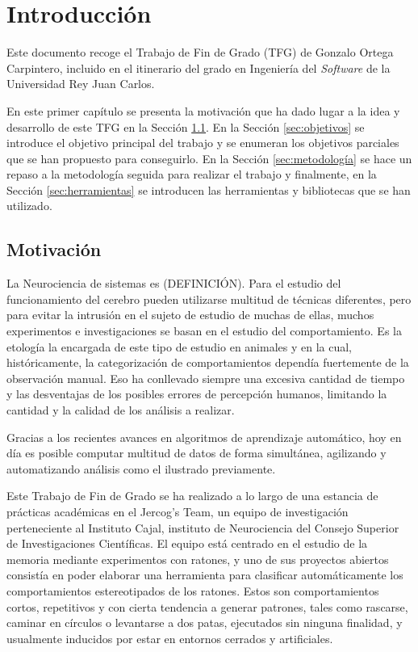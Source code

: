 \chapter{Introducción}
Este documento recoge el Trabajo de Fin de Grado (TFG) de Gonzalo Ortega Carpintero, incluido en el itinerario del grado en Ingeniería del \textit{Software} de la Universidad Rey Juan Carlos.

En este primer capítulo se presenta la motivación que ha dado lugar a la idea y desarrollo de este TFG en la Sección \ref{sec:motivacion}. En la Sección \ref{sec:objetivos} se introduce el objetivo principal del trabajo y se enumeran los objetivos parciales que se han propuesto para conseguirlo. En la Sección \ref{sec:metodología} se hace un repaso a la metodología seguida para realizar el trabajo y finalmente, en la Sección \ref{sec:herramientas} se introducen las herramientas y bibliotecas que se han utilizado.

\section{Motivación} \label{sec:motivacion}

La Neurociencia de sistemas es (DEFINICIÓN). Para el estudio del funcionamiento del cerebro pueden utilizarse multitud de técnicas diferentes, pero para evitar la intrusión en el sujeto de estudio de muchas de ellas, muchos experimentos e investigaciones se basan en el estudio del comportamiento. Es la etología la encargada de este tipo de estudio en animales y en la cual, históricamente, la categorización de comportamientos dependía fuertemente de la observación manual. Eso ha conllevado siempre una excesiva cantidad de tiempo y las desventajas de los posibles errores de percepción humanos, limitando la cantidad y la calidad de los análisis a realizar.

Gracias a los recientes avances en algoritmos de aprendizaje automático, hoy en día es posible computar multitud de datos de forma simultánea, agilizando y automatizando análisis como el ilustrado previamente.

Este Trabajo de Fin de Grado se ha realizado a lo largo de una estancia de prácticas académicas en el Jercog's Team, un equipo de investigación perteneciente al Instituto Cajal, instituto de Neurociencia del Consejo Superior de Investigaciones Científicas. El equipo está centrado en el estudio de la memoria mediante experimentos con ratones, y uno de sus proyectos abiertos consistía en poder elaborar una herramienta para clasificar automáticamente los comportamientos estereotipados de los ratones. Estos son comportamientos cortos, repetitivos y con cierta tendencia a generar patrones, tales como rascarse, caminar en círculos o levantarse a dos patas, ejecutados sin ninguna finalidad, y usualmente inducidos por estar en entornos cerrados y artificiales.


